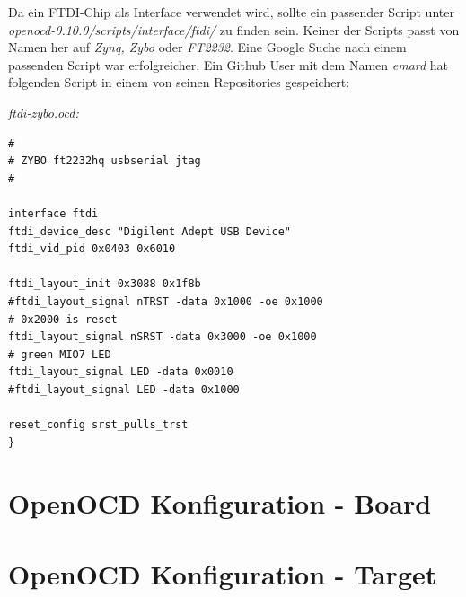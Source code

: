 Da ein FTDI-Chip als Interface verwendet wird, sollte ein passender Script unter \textit{openocd-0.10.0/scripts/interface/ftdi/} zu finden sein.
Keiner der Scripts passt von Namen her auf \textit{Zynq, Zybo} oder \textit{FT2232}.
Eine Google Suche nach einem passenden Script war erfolgreicher.
Ein Github User mit dem Namen \textit{emard} hat folgenden Script in einem von seinen Repositories gespeichert:

\textit{ftdi-zybo.ocd:}
\begin{lstlisting}
#
# ZYBO ft2232hq usbserial jtag
#

interface ftdi
ftdi_device_desc "Digilent Adept USB Device"
ftdi_vid_pid 0x0403 0x6010

ftdi_layout_init 0x3088 0x1f8b
#ftdi_layout_signal nTRST -data 0x1000 -oe 0x1000
# 0x2000 is reset
ftdi_layout_signal nSRST -data 0x3000 -oe 0x1000
# green MIO7 LED
ftdi_layout_signal LED -data 0x0010
#ftdi_layout_signal LED -data 0x1000

reset_config srst_pulls_trst
}
\end{lstlisting}




\section{OpenOCD Konfiguration - Board}
\section{OpenOCD Konfiguration - Target}
